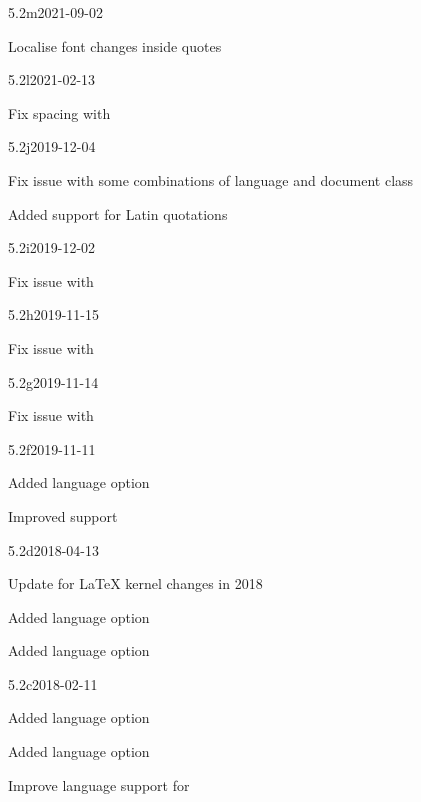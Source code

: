\documentclass{ltxdockit}[2010/09/26]
\begin{document}
\begin{changelog}

\begin{release}{5.2m}{2021-09-02}
\item Localise font changes inside quotes
\end{release}


\begin{release}{5.2l}{2021-02-13}
\item Fix spacing with 
\end{release}

\begin{release}{5.2j}{2019-12-04}
\item Fix issue with some combinations of language and document class
\item Added support for Latin quotations
\end{release}


\begin{release}{5.2i}{2019-12-02}
\item Fix issue with 
\end{release}

\begin{release}{5.2h}{2019-11-15}
\item Fix issue with 
\end{release}

\begin{release}{5.2g}{2019-11-14}
\item Fix issue with 
\end{release}

\begin{release}{5.2f}{2019-11-11}
\item Added language option 
\item Improved  support
\end{release}

\begin{release}{5.2d}{2018-04-13}
\item Update for \LaTeX{} kernel changes in 2018
\item Added language option 
\item Added language option 
\end{release}

\begin{release}{5.2c}{2018-02-11}
\item Added language option 
\item Added language option 
\item Improve language support for 
\end{release}


\end{changelog}
\end{document}
